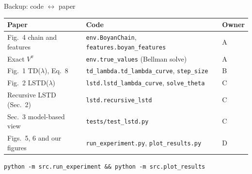 \documentclass[aspectratio=169,11pt]{beamer}
\begin{document}
\begin{frame}{Backup: code $\leftrightarrow$ paper}
  \small
  \begin{tabular}{@{}lll@{}}
    \toprule
    Paper & Code & Owner \\
    \midrule
    Fig.~4 chain and features & \texttt{env.BoyanChain}, \texttt{features.boyan\_features} & A \\
    Exact $V^\pi$ & \texttt{env.true\_values} (Bellman solve) & A \\
    Fig.~1 TD($\lambda$), Eq.~8 & \texttt{td\_lambda.td\_lambda\_curve}, \texttt{step\_size} & B \\
    Fig.~2 LSTD($\lambda$) & \texttt{lstd.lstd\_lambda\_curve}, \texttt{solve\_theta} & C \\
    Recursive LSTD (Sec.~2) & \texttt{lstd.recursive\_lstd} & C \\
    Sec.~3 model-based view & \texttt{tests/test\_lstd.py} & C \\
    Figs.~5, 6 and our figures & \texttt{run\_experiment.py}, \texttt{plot\_results.py} & D \\
    \bottomrule
  \end{tabular}
  \vspace{0.6em}

  \texttt{python -m src.run\_experiment \&\& python -m src.plot\_results}
\end{frame}
\end{document}
